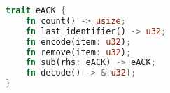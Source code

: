 \begin{lstfloat}[t]
\begin{lstlisting}[language=Rust]
trait eACK {
    fn count() -> usize;
    fn last_identifier() -> u32;
    fn encode(item: u32);
    fn remove(item: u32);
    fn sub(rhs: eACK) -> eACK;
    fn decode() -> &[u32];
}
\end{lstlisting}
\vspace{-0.3cm}
\label{lst:quack-interface}
\end{lstfloat}
